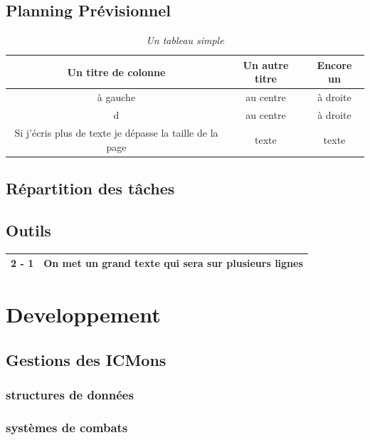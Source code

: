 \documentclass[12pt,a4paper, twoside]{article}
\begin{document}
\subsection{Planning Prévisionnel}
\begin{table}[h]
    \centering
    \begin{tabular}{|c|c|c|}
        \hline
        Un titre de colonne & Un autre titre & Encore un \\
        \hline
        à gauche & au centre & à droite \\
        \hline
        d & au centre & à droite \\
        \hline
        Si j'écris plus de texte je dépasse la taille de la page & texte & texte \\
        \hline
    \end{tabular}
    \vspace{1cm}
    \caption{\emph{Un tableau simple}}
    \label{tab:test}
\end{table}

\subsection{Répartition des tâches}
\subsection{Outils}
\newpage
\begin{center}
\begin{tabular}{|c|p{8cm}|}
\hline
2 - 1 & On met un grand texte qui sera sur plusieurs lignes \\
\hline
\end{tabular}
\end{center}

\section{Developpement}
\subsection{Gestions des ICMons}
    \subsubsection{structures de données}
    \subsubsection{systèmes de combats}
\end{document}
